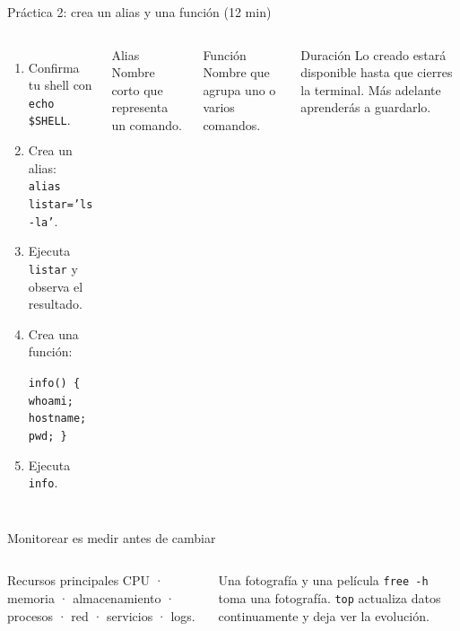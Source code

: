 \documentclass[aspectratio=169,10pt,c]{beamer}
\begin{document}
\begin{frame}{Práctica 2: crea un alias y una función \textnormal{\small(12 min)}}
\begin{columns}[T,onlytextwidth]
\begin{enumerate}\setlength\itemsep{5pt}\small
  \item Confirma tu shell con \texttt{echo \$SHELL}.
  \item Crea un alias: \texttt{alias listar='ls -la'}.
  \item Ejecuta \texttt{listar} y observa el resultado.
  \item Crea una función:\par
  \texttt{info() \{ whoami; hostname; pwd; \}}
  \item Ejecuta \texttt{info}.
\end{enumerate}
\begin{block}{Alias}
\small Nombre corto que representa un comando.
\end{block}
\begin{exampleblock}{Función}
\small Nombre que agrupa uno o varios comandos.
\end{exampleblock}
\begin{alertblock}{Duración}
\small Lo creado estará disponible hasta que cierres la terminal. Más adelante aprenderás a guardarlo.
\end{alertblock}
\end{columns}
\end{frame}

\begin{frame}{Monitorear es medir antes de cambiar}
\begin{columns}[T,onlytextwidth]
\begin{block}{Recursos principales}
\small CPU · memoria · almacenamiento · procesos · red · servicios · logs.
\end{block}
\begin{exampleblock}{Una fotografía y una película}
\small \texttt{free -h} toma una fotografía. \texttt{top} actualiza datos continuamente y deja ver la evolución.
\end{exampleblock}
\end{columns}
\end{frame}
\end{document}
